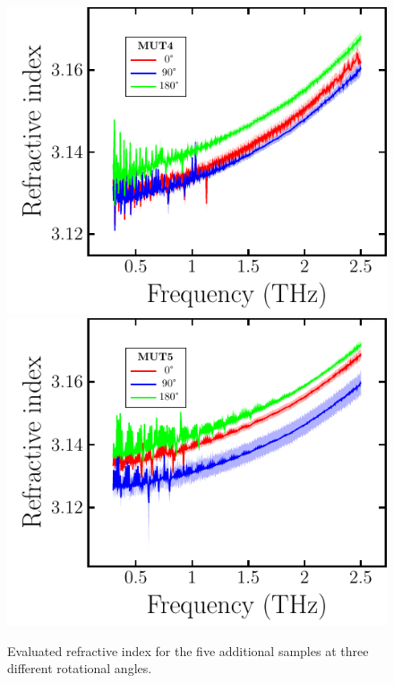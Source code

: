\begin{figure}[H]
\qquad
\subcaptionbox{\label{fig:ceramic_MUT4}}
    {\hspace*{-2em}\includegraphics[width=0.45\linewidth]{images/appendix/plots/real/MUT4.pdf}}
\subcaptionbox{\label{fig:ceramic_MUT5}}
    {\includegraphics[width=0.45\linewidth]{images/appendix/plots/real/MUT5.pdf}}
\caption{Evaluated refractive index for the five additional samples at three different rotational angles.}
\label{fig:ceramic_MUTs}
\end{figure}


